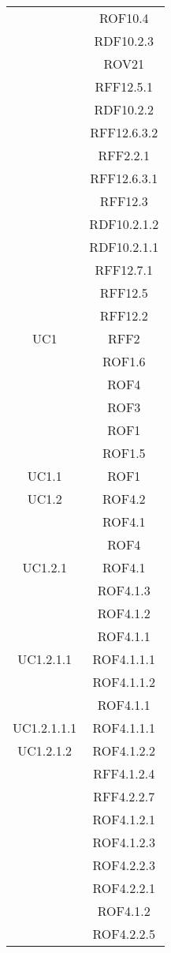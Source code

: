 \begin{longtable}{|c|c|}
& ROF10.4\\
& RDF10.2.3\\
& ROV21\\
& RFF12.5.1\\
& RDF10.2.2\\
& RFF12.6.3.2\\
& RFF2.2.1\\
& RFF12.6.3.1\\
& RFF12.3\\
& RDF10.2.1.2\\
& RDF10.2.1.1\\
& RFF12.7.1\\
& RFF12.5\\
& RFF12.2\\

\midrule
UC1
& RFF2\\
& ROF1.6\\
& ROF4\\
& ROF3\\
& ROF1\\
& ROF1.5\\

\midrule
UC1.1
& ROF1\\

\midrule
UC1.2
& ROF4.2\\
& ROF4.1\\
& ROF4\\

\midrule
UC1.2.1
& ROF4.1\\
& ROF4.1.3\\
& ROF4.1.2\\
& ROF4.1.1\\

\midrule
UC1.2.1.1
& ROF4.1.1.1\\
& ROF4.1.1.2\\
& ROF4.1.1\\

\midrule
UC1.2.1.1.1
& ROF4.1.1.1\\

\midrule
UC1.2.1.2
& ROF4.1.2.2\\
& RFF4.1.2.4\\
& RFF4.2.2.7\\
& ROF4.1.2.1\\
& ROF4.1.2.3\\
& ROF4.2.2.3\\
& ROF4.2.2.1\\
& ROF4.1.2\\
& ROF4.2.2.5\\


\end{longtable}
